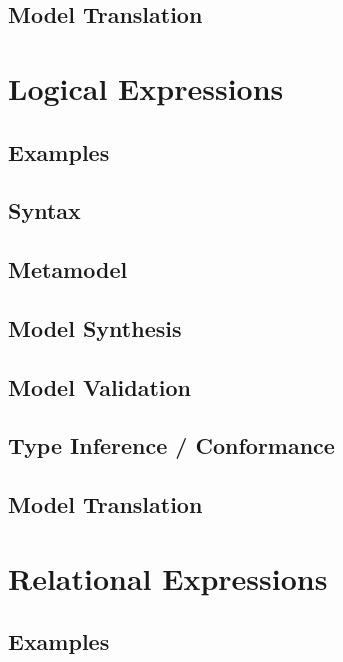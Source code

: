 \documentclass[a4paper,oneside,12pt, extrafontsizes]{memoir}
\begin{document}
    \section{Model Translation}

  \chapter{Logical Expressions}
  \label{ch:logical}
  

    \section{Examples}
    

    \section{Syntax}
    

    \section{Metamodel}

    \section{Model Synthesis}

    \section{Model Validation}
    

    \section{Type Inference / Conformance}

    \section{Model Translation}

  \chapter{Relational Expressions}
  \label{ch:relational}
  

    \section{Examples}
    
\end{document}
